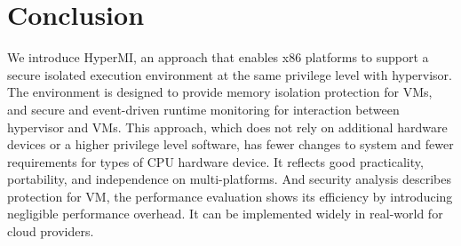 \documentclass[conference]{IEEEtran}
\begin{document}
\section{Conclusion}\label{sec:conclusion}
We introduce HyperMI, an approach that enables x86 platforms to support a secure isolated execution environment at the same privilege level with hypervisor. The environment is designed to provide memory isolation protection for VMs, and secure and event-driven runtime monitoring for interaction between hypervisor and VMs. This approach, which does not rely on additional hardware devices or a higher privilege level software, has fewer changes to system and fewer requirements for types of CPU hardware device. It reflects good practicality, portability, and independence on multi-platforms. And security analysis describes protection for VM, the performance evaluation shows its efficiency by introducing negligible performance overhead. It can be implemented widely in real-world for cloud providers.


 

\end{document}
